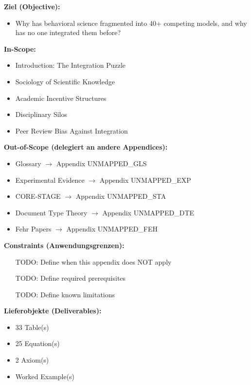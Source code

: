 \begin{tcolorbox}[
    colback=orange!5!white,
    colframe=orange!75!black,
    title={\textbf{Appendix Scope: Ziel / In-Scope / Out-of-Scope / Constraints}},
    fonttitle=\bfseries
]

\textbf{Ziel (Objective):}
\begin{itemize}[nosep]
    \item Why has behavioral science fragmented into 40+ competing models, and why
has no one integrated them before?
\end{itemize}

\textbf{In-Scope:}
\begin{itemize}[nosep]
    \item Introduction: The Integration Puzzle
    \item Sociology of Scientific Knowledge
    \item Academic Incentive Structures
    \item Disciplinary Silos
    \item Peer Review Bias Against Integration
\end{itemize}

\textbf{Out-of-Scope (delegiert an andere Appendices):}
\begin{itemize}[nosep]
    \item Glossary $\rightarrow$ Appendix UNMAPPED_GLS
    \item Experimental Evidence $\rightarrow$ Appendix UNMAPPED_EXP
    \item CORE-STAGE $\rightarrow$ Appendix UNMAPPED_STA
    \item Document Type Theory $\rightarrow$ Appendix UNMAPPED_DTE
    \item Fehr Papers $\rightarrow$ Appendix UNMAPPED_FEH
\end{itemize}

\textbf{Constraints (Anwendungsgrenzen):}
\begin{itemize}[nosep]
    \item [TODO: Define when this appendix does NOT apply]
    \item [TODO: Define required prerequisites]
    \item [TODO: Define known limitations]
\end{itemize}

\textbf{Lieferobjekte (Deliverables):}
\begin{itemize}[nosep]
    \item 33 Table(s)
    \item 25 Equation(s)
    \item 2 Axiom(s)
    \item Worked Example(s)
\end{itemize}

\end{tcolorbox}



